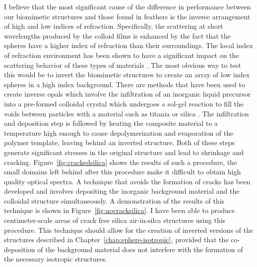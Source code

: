 I believe that the most significant cause of the difference in performance between our biomimetic structures and those found in feathers is the inverse arrangement of high and low indices of refraction.
Specifically, the scattering at short wavelengths produced by the colloid films is enhanced by the fact that the spheres have a higher index of refraction than their surroundings.
The local index of refraction environment has been shown to have a significant impact on the scattering behavior of these types of materials \cite{Liew:2011}.
The most obvious way to test this would be to invert the biomimetic structures to create an array of low index spheres in a high index background.
There are methods that have been used to create inverse opals which involve the infiltration of an inorganic liquid precursor into a pre-formed colloidal crystal which undergoes a sol-gel reaction to fill the voids between particles with a material such as titania or silica \cite{Schroden:2002}.
The infiltration and deposition step is followed by heating the composite material to a temperature high enough to cause depolymerization and evaporation of the polymer template, leaving behind an inverted structure.
Both of these steps generate significant stresses in the original structure and lead to shrinkage and cracking.
Figure~\ref{fig:crackedsilica} shows the results of such a procedure, the small domains left behind after this procedure make it difficult to obtain high quality optical spectra.
A technique that avoids the formation of cracks has been developed \cite{Hatton:2010} and involves depositing the inorganic background material and the colloidal structure simultaneously.
A demonstration of the results of this technique is shown in Figure~\ref{fig:nocracksilica}.
I have been able to produce centimeter-scale areas of crack free silica air-in-silca structures using this procedure.
This technique should allow for the creation of inverted versions of the structures described in Chapter~\ref{chap:sphere-isotropic}, provided that the co-deposition of the background material does not interfere with the formation of the necessary isotropic structures.

